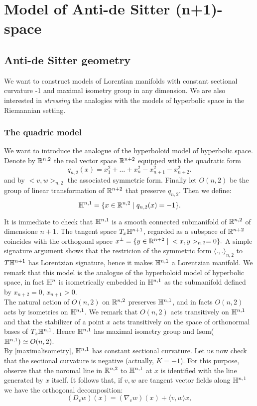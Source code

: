 \chapter{Model of Anti-de Sitter (n+1)-space}
\section{Anti-de Sitter geometry}
We want to construct models of Lorentian manifolds with constant sectional curvature -1 and maximal isometry group in any dimension. We are also interested in \textit{stressing} the analogies with the models of hyperbolic space in the Riemannian setting. 

\subsection{The quadric model}
We want to introduce the analogue of the hyperboloid model of hyperbolic space. Denote by $\mathbb{R}^{n,2}$ the real vector space $\mathbb{R}^{n+2}$ equipped with the quadratic form 
\[
    q_{n,2}(x)=x_1^{2}+\dots+x_n^{2}-x_{n+1}^{2}-x_{n+2}^2.   
\]
and by $<v,w>_{n,2}$ the associated symmetric form. Finally let $O(n,2)$ be the group of linear transformation of $\mathbb{R}^{n+2}$ that preserve $q_{n,2}.$
Then we define: 
\[
    \mathbb{H}^{n,1}=\{x\in \mathbb{R}^{n,2}\;|\;q_{n,2}(x)=-1\}.
\]

It is immediate to check that $\mathbb{H}^{n,1}$ is a smooth connected submanifold of $\mathbb{R}^{n,2}$ of dimensione $n+1$. The tangent space $T_x\mathbb{H}^{n+1}$, regarded as a subspace of $\mathbb{R}^{n+2}$ coincides with the orthogonal space $x^{\perp}=\{y\in \mathbb{R}^{n+2}\;|\;<x,y>_{n,2}=0\}.$ A simple signature argument shows that the restricion of the symmetric form $\langle .,. \rangle_{n,2}$ to $T\mathbb{H}^{n+1}$ has Lorentzian signature, hence it makes $\mathbb{H}^{n,1}$ a Lorentzian manifold. We remark that this model is the analogue of the hyperboloid model of hyperbolic space, in fact $\mathbb{H}^n$ is isometrically embedded in $\mathbb{H}^{n,1}$ as the submanifold defined by $x_{n+2}=0$, $x_{n+1}>0$. \\
The natural action of $O(n,2)$ on $\mathbb{R}^{n,2}$ preserves $\mathbb{H}^{n,1}$, and in facts $O(n,2)$ acts by isometries on $\mathbb{H}^{n,1}$. We remark that $O(n,2)$ acts transitively on $\mathbb{H}^{n,1}$ and that the stabilizer of a point $x$ acts transitively on the space of orthonormal bases of $T_x\mathbb{H}^{n,1}$. Hence $\mathbb{H}^{n,1}$ has maximal isometry group and Isom($\mathbb{H}^{n,1})\simeq O(n,2)$.\\
By \ref{maximalisometry}, $\mathbb{H}^{n,1}$ has constant sectional curvature. Let us now check that the sectional curvature is negative (actually, $K=-1$). For this purpose, observe that the noromal line in $\mathbb{R}^{n,2}$ to $\mathbb{H}^{n,1}$ at $x$ is identified with the line generated by $x$ itself. It follows that, if $v,w$ are tangent vector fields along $\mathbb{H}^{n,1}$ we have the orthogonal decomposition: 
\[
    (D_{v}w)(x)=(\nabla_{v}w)(x)+\langle v,w\rangle x, 
\]

